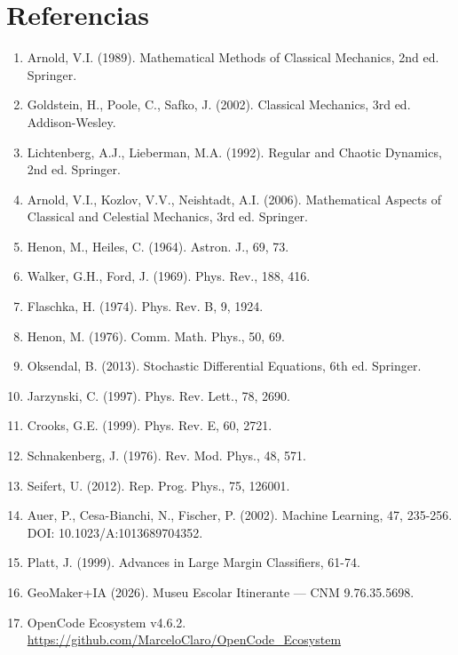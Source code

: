 \documentclass[12pt,a4paper,oneside]{article}
\begin{document}
\section{Referencias}
\begin{enumerate}[leftmargin=*]
\item Arnold, V.I. (1989). Mathematical Methods of Classical Mechanics, 2nd ed. Springer.
\item Goldstein, H., Poole, C., Safko, J. (2002). Classical Mechanics, 3rd ed. Addison-Wesley.
\item Lichtenberg, A.J., Lieberman, M.A. (1992). Regular and Chaotic Dynamics, 2nd ed. Springer.
\item Arnold, V.I., Kozlov, V.V., Neishtadt, A.I. (2006). Mathematical Aspects of Classical and Celestial Mechanics, 3rd ed. Springer.
\item Henon, M., Heiles, C. (1964). Astron. J., 69, 73.
\item Walker, G.H., Ford, J. (1969). Phys. Rev., 188, 416.
\item Flaschka, H. (1974). Phys. Rev. B, 9, 1924.
\item Henon, M. (1976). Comm. Math. Phys., 50, 69.
\item Oksendal, B. (2013). Stochastic Differential Equations, 6th ed. Springer.
\item Jarzynski, C. (1997). Phys. Rev. Lett., 78, 2690.
\item Crooks, G.E. (1999). Phys. Rev. E, 60, 2721.
\item Schnakenberg, J. (1976). Rev. Mod. Phys., 48, 571.
\item Seifert, U. (2012). Rep. Prog. Phys., 75, 126001.
\item Auer, P., Cesa-Bianchi, N., Fischer, P. (2002). Machine Learning, 47, 235-256. DOI: 10.1023/A:1013689704352.
\item Platt, J. (1999). Advances in Large Margin Classifiers, 61-74.
\item GeoMaker+IA (2026). Museu Escolar Itinerante — CNM 9.76.35.5698.
\item OpenCode Ecosystem v4.6.2. \url{https://github.com/MarceloClaro/OpenCode_Ecosystem}
\end{enumerate}
\end{document}

